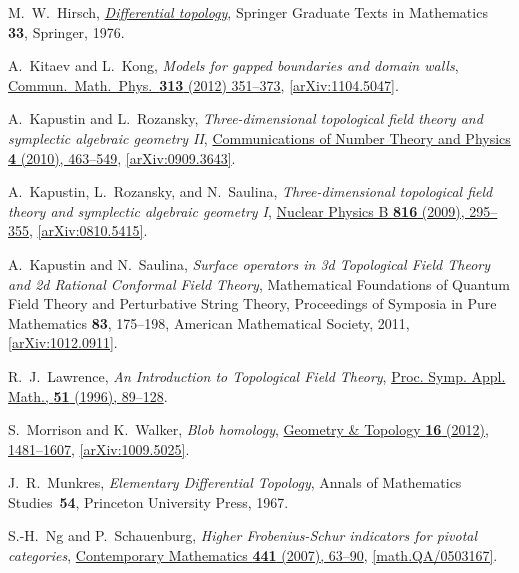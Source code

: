 \documentclass[12pt]{scrartcl}
\newcommand\doi[2]        {\href{http://dx.doi.org/#1}{#2}}
\theoremstyle{definition}
\numberwithin{equation}{section}
\numberwithin{definition}{section}
\numberwithin{figure}{section}
\begin{document}
\begin{thebibliography}{BDSPV}
M.~W.~Hirsch, 
\textsl{\doi{10.1007/978-1-4684-9449-5}{Differential topology}}, 
Springer Graduate Texts in Mathematics \textbf{33}, Springer, 1976. 

A.~Kitaev and L.~Kong, 
\textsl{Models for gapped boundaries and domain walls},
\doi{10.1007/s00220-012-1500-5}{Commun.\ Math.\ Phys.\ \textbf{313} (2012) 351--373},
\href{http://arxiv.org/abs/1104.5047}{[arXiv:1104.5047]}.

A.~Kapustin and L.~Rozansky, 
\textsl{Three-dimensional topological field theory and symplectic algebraic geometry II}, 
\doi{10.4310/CNTP.2010.v4.n3.a1}{Communications of Number Theory and Physics \textbf{4} (2010), 463--549}, 
\href{http://arxiv.org/abs/0909.3643}{[arXiv:0909.3643]}.

A.~Kapustin, L.~Rozansky, and N.~Saulina, 
\textsl{Three-dimensional topological field theory and symplectic algebraic geometry I}, 
\doi{10.1016/j.nuclphysb.2009.01.027}{Nuclear Physics B \textbf{816} (2009), 295--355}, 
\href{http://arxiv.org/abs/0810.5415}{[arXiv:0810.5415]}.

A.~Kapustin and N.~Saulina, 
\textsl{Surface operators in 3d Topological Field Theory and 2d Rational Conformal Field Theory}, 
Mathematical Foundations of Quantum Field Theory and Perturbative String Theory, 
Proceedings of Symposia in Pure Mathematics \textbf{83}, 175--198, 
American Mathematical Society, 2011, 
\href{http://arxiv.org/abs/1012.0911}{[arXiv:1012.0911]}.

R.~J.~Lawrence, 
\textsl{An Introduction to Topological Field Theory}, 
\doi{10.1090/psapm/051}{Proc. Symp. Appl. Math., \textbf{51} (1996), 89--128}. 

S.~Morrison and K.~Walker, 
\textsl{Blob homology}, 
\doi{10.2140/gt.2012.16.1481}{Geometry \& Topology \textbf{16} (2012), 1481--1607}, 
\href{http://arxiv.org/abs/1009.5025}{[arXiv:1009.5025]}.  

J.~R.~Munkres, 
\textsl{Elementary Differential Topology}, 
Annals of Mathematics Studies~\textbf{54}, 
Princeton University Press, 
1967.

S.-H.~Ng and P.~Schauenburg, 
\textsl{Higher Frobenius-Schur indicators for pivotal categories}, 
\doi{10.1090/conm/441/08500}{Contemporary Mathematics \textbf{441} (2007), 63--90}, 
\href{http://arxiv.org/abs/math/0503167}{[math.QA/0503167]}.


\end{thebibliography}
\end{document}
